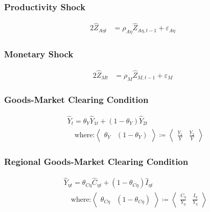 \documentclass[../thesis.tex]{subfiles}
\begin{document}

\subsubsection*{Productivity Shock}

\begin{alignat}{2}
	\hat{Z}_{A\eta t} &= \rho_{A\eta} \hat{Z}_{A\eta, t-1} + \varepsilon_{A\eta} \label{eq_v2:reg-ll-productivity-shock}
\end{alignat}


\subsubsection*{Monetary Shock}

\begin{alignat}{2}
	\hat{Z}_{Mt} &= \rho_M \hat{Z}_{M,t-1} + \varepsilon_{M} \label{eq_v2:reg-ll-monetary-shock}
\end{alignat}




\subsubsection*{Goods-Market Clearing Condition}

\begin{align}
	& \hat{Y}_{t} = \theta_{Y} \hat{Y}_{1t} + (1-\theta_{Y}) \hat{Y}_{2t} \label{eq_v2:reg-ll-market-clearing-condition-Yt-3} \\
	& \quad \text{where:} \left\langle \begin{matrix} \theta_{Y} & (1-\theta_{Y}) \end{matrix} \right\rangle \coloneq \left\langle \begin{matrix} \frac{Y_{1}}{Y} & \frac{Y_{2}}{Y} \end{matrix} \right\rangle \label{eq_v2:reg-ss-Y1-Y2-weight-in-Y}
\end{align}


\subsubsection*{Regional Goods-Market Clearing Condition}

\begin{align}
	& \hat{Y}_{\eta t} = \theta_{C\eta} \hat{C}_{\eta t} + (1 - \theta_{C\eta}) \hat{I}_{\eta t} \label{eq_v2:reg-ll-total-yn-2} \\
	& \quad \text{where:} \left\langle \begin{matrix} \theta_{C\eta} & (1 - \theta_{C\eta}) \end{matrix} \right\rangle \coloneq \left\langle \begin{matrix} \frac{C_{\eta}}{Y_{\eta}} & \frac{I_{\eta}}{Y_{\eta}} \end{matrix} \right\rangle \label{eq_v2:reg-ss-C-I-weight-in-Y}
\end{align}
\end{document}
